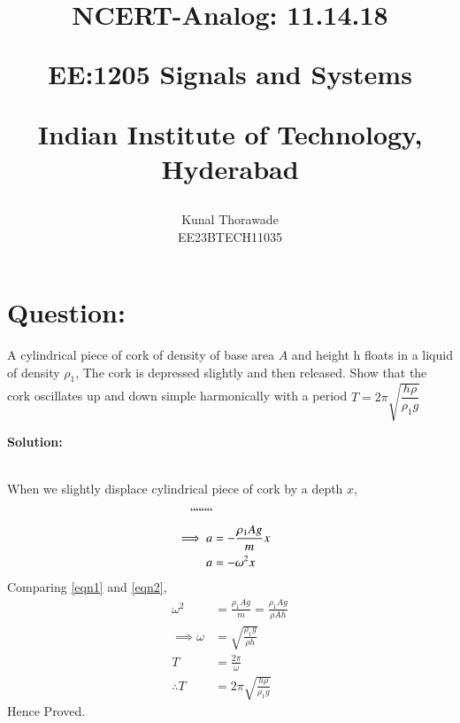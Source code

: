 \documentclass[journal,12pt,twocolumn]{IEEEtran}
\theoremstyle{remark}
\begin{document}
%




\vspace{3cm}

\title{
NCERT-Analog: 11.14.18

\large{EE:1205 Signals and Systems}

Indian Institute of Technology, Hyderabad
}
\author{Kunal Thorawade

EE23BTECH11035
}	
\maketitle


\newpage


\bigskip
 
 \renewcommand{\thefigure}{\theenumi}
 \renewcommand{\thetable}{\arabic{table}}

 \section{Question:}
 A cylindrical piece of cork of density of base area $A$ and height h floats in a liquid of density $\rho_1$, The cork is depressed slightly and then released. Show that the cork oscillates up and down simple harmonically with a period $T = 2\pi\sqrt{\dfrac{h\rho}{\rho_{1}g}}$

 \textbf{Solution:} 
 
 \begin{figure}[!ht]
     
     \end{figure} \\
     When we slightly displace cylindrical piece of cork by a depth $x$,
     \begin{align}
         ```````` \\
	     \implies a &= -\frac{\rho_1Ag}{m}x \label{eqn1} \\
	         a &= -\omega^2x \label{eqn2}
		 \end{align}
		 Comparing \ref{eqn1} and \ref{eqn2},
		 \begin{align}
		     \omega^2 &= \frac{\rho_1Ag}{m} = \frac{\rho_1Ag}{\rho Ah} \\
		         \implies\omega &= \sqrt{\frac{\rho_1g}{\rho h}} \\
			     T &= \frac{2\pi}{\omega} \\
			         \therefore T &= 2\pi\sqrt{\frac{h\rho}{\rho_1 g}}
				 \end{align}
				 Hence Proved.
				 
\end{document}
